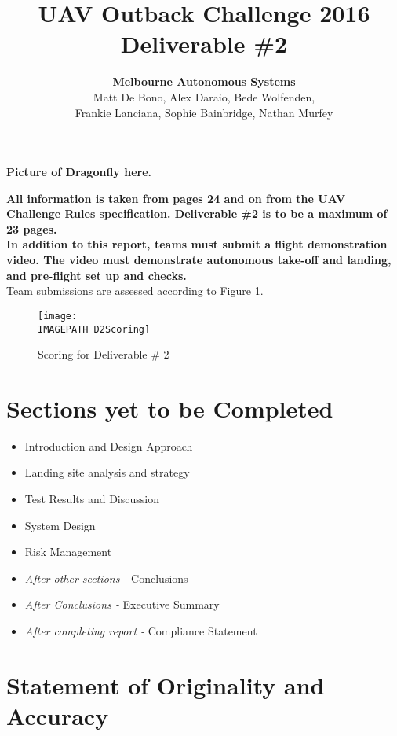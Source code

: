 \documentclass{article}
\title{UAV Outback Challenge 2016\\ Deliverable \#2\\}
\author{
	\textbf{Melbourne Autonomous Systems}\\
	Matt De Bono,
	Alex Daraio,
	Bede Wolfenden,\\
	Frankie Lanciana,
	Sophie Bainbridge,
	Nathan Murfey}
\newcommand{\IMAGEPATH}{../Images/}
\begin{document}
\maketitle

\textbf{Picture of Dragonfly here.}

\clearpage

\tableofcontents

\clearpage

\textbf{All information is taken from pages 24 and on from the UAV Challenge Rules specification. Deliverable \#2 is to be a maximum of 23 pages.}\\

\textbf{In addition to this report, teams must submit a flight demonstration video. The video must demonstrate autonomous take-off and landing, and pre-flight set up and checks.}\\

Team submissions are assessed according to Figure \ref{fig:D2Scoring}.

\begin{figure}[h]
	\centering
	\texttt{[image: \\IMAGEPATH D2Scoring]}
	\caption{Scoring for Deliverable \# 2}
	\label{fig:D2Scoring}
\end{figure}

\section{Sections yet to be Completed}
\begin{itemize}
	\item Introduction and Design Approach
	\item Landing site analysis and strategy
	\item Test Results and Discussion
	\item System Design
	\item Risk Management
	\item \textit{After other sections -} Conclusions
	\item \textit{After Conclusions -} Executive Summary
	\item \textit{After completing report -} Compliance Statement
\end{itemize}

\clearpage

\section{Statement of Originality and Accuracy}

\end{document}

